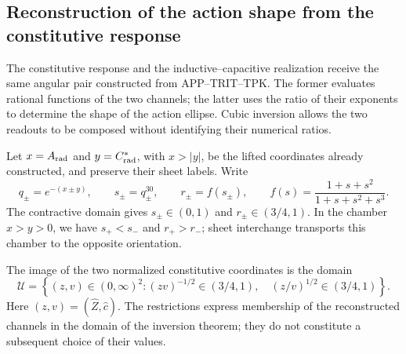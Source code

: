 \subsection{Reconstruction of the action shape from the constitutive response}
\label{iii:iii:subsec:puente-forma-LC}

The constitutive response and the inductive--capacitive realization receive
the same angular pair constructed from APP--TRIT--TPK. The former evaluates
rational functions of the two channels; the latter uses the ratio of
their exponents to determine the shape of the action ellipse. Cubic
inversion allows the two readouts to be composed without identifying their
numerical ratios.

Let $x=A_{\rm rad}$ and $y=C^*_{\rm rad}$, with $x>|y|$, be the lifted
coordinates already constructed, and preserve their sheet labels. Write
\begin{equation}
 q_\pm=e^{-(x\pm y)},\qquad s_\pm=q_\pm^{30},\qquad
 r_\pm=f(s_\pm),\qquad
 f(s)=\frac{1+s+s^2}{1+s+s^2+s^3}.
 \label{iii:iii:eq:forma-canales}
\end{equation}
The contractive domain gives $s_\pm\in(0,1)$ and
$r_\pm\in(3/4,1)$. In the chamber $x>y>0$, we have
$s_+<s_-$ and $r_+>r_-$; sheet interchange transports this chamber
to the opposite orientation.

The image of the two normalized constitutive coordinates is the domain
\begin{equation}
 \mathcal U=\left\{(z,v)\in(0,\infty)^2:
   (zv)^{-1/2}\in(3/4,1),\quad
   (z/v)^{1/2}\in(3/4,1)\right\}.
 \label{iii:iii:eq:forma-dominio}
\end{equation}
Here $(z,v)=(\widehat Z,\widehat c)$. The restrictions express
membership of the reconstructed channels in the domain of the inversion
theorem; they do not constitute a subsequent choice of their values.

